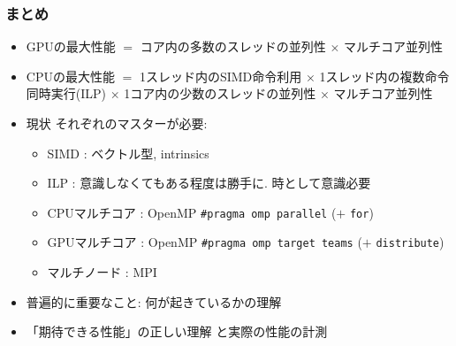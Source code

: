 \documentclass[10pt,dvipdfmx]{beamer}
\newcommand{\ao}[1]{{\color{blue}#1}}
\begin{document}
\fi

\begin{frame}[fragile]
  \frametitle{まとめ}

  \begin{itemize}
  \item GPUの最大性能 $=$
    \ao{コア内の多数のスレッドの並列性}
    $\times$ \ao{マルチコア並列性}
  \item CPUの最大性能 $=$
    \ao{1スレッド内のSIMD命令利用}
    $\times$ \ao{1スレッド内の複数命令同時実行(ILP)}
    $\times$ \ao{1コア内の少数のスレッドの並列性}
    $\times$ \ao{マルチコア並列性}
  \item 現状 それぞれのマスターが必要:
    \begin{itemize}
    \item SIMD : ベクトル型, intrinsics
    \item ILP : 意識しなくてもある程度は勝手に. 時として意識必要
    \item CPUマルチコア : OpenMP {\tt \#pragma omp parallel} ($+$ {\tt for})
    \item GPUマルチコア : OpenMP {\tt \#pragma omp target teams} ($+$ {\tt distribute})
    \item マルチノード : MPI
    \end{itemize}
  \item 普遍的に重要なこと: 何が起きているかの理解
  \item 「期待できる性能」の正しい理解
    と実際の性能の計測
  \end{itemize}
\end{frame}
\end{document}

